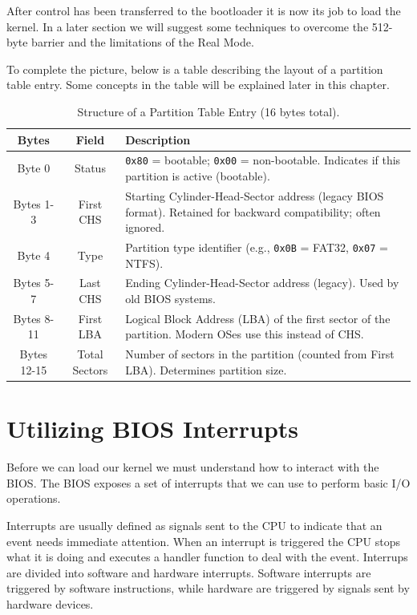 After control has been transferred to the bootloader it is now its job to load the kernel. In a later section 
we will suggest some techniques to overcome the 512-byte barrier and the limitations of the Real Mode. 

To complete the picture, below is a table describing the layout of a partition table entry.
Some concepts in the table will be explained later in this chapter.

\begin{table}[h]
    \centering
    \renewcommand{\arraystretch}{1.15}
    \setlength{\tabcolsep}{10pt}
    
    \begin{tabular}{|c|c|p{7cm}|}
    \hline
    \textbf{Bytes} & \textbf{Field} & \textbf{Description} \\
    \hline
    Byte 0 & Status & 
    \texttt{0x80} = bootable; \texttt{0x00} = non-bootable. Indicates if this partition is active (bootable). \\
    \hline
    Bytes 1-3 & First CHS & 
    Starting Cylinder-Head-Sector address (legacy BIOS format). Retained for backward compatibility; often ignored. \\
    \hline
    Byte 4 & Type & 
    Partition type identifier (e.g., \texttt{0x0B} = FAT32, \texttt{0x07} = NTFS). \\
    \hline
    Bytes 5-7 & Last CHS & 
    Ending Cylinder-Head-Sector address (legacy). Used by old BIOS systems. \\
    \hline
    Bytes 8-11 & First LBA & 
    Logical Block Address (LBA) of the first sector of the partition. Modern OSes use this instead of CHS. \\
    \hline
    Bytes 12-15 & Total Sectors & 
    Number of sectors in the partition (counted from First LBA). Determines partition size. \\
    \hline
    \end{tabular}
    \caption{Structure of a Partition Table Entry (16 bytes total).}
\end{table}

\section{Utilizing BIOS Interrupts}

Before we can load our kernel we must understand how to interact with the BIOS. The BIOS exposes a set of
interrupts that we can use to perform basic I/O operations.

Interrupts are usually defined as signals sent to the CPU to indicate that an event needs immediate attention.
When an interrupt is triggered the CPU stops what it is doing and executes a handler function to deal with the event.
Interrups are divided into software and hardware interrupts. Software interrupts are triggered by software instructions, 
while hardware are triggered by signals sent by hardware devices.

